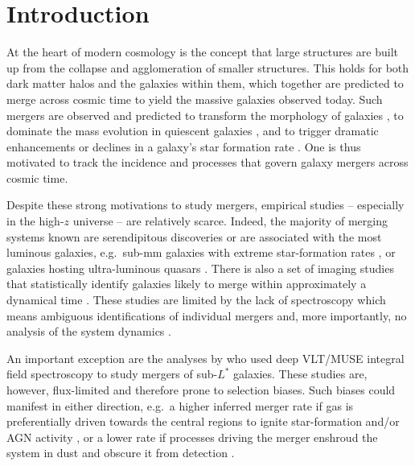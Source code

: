 \documentclass[twocolumn]{aastex62}
\newcommand{\lya}{Ly$\alpha$}
\begin{document}
\section{Introduction}

At the heart of modern cosmology is the concept that large structures are built up 
from the collapse and agglomeration of smaller structures. This holds for both dark 
matter halos and the galaxies within them, which together are predicted to merge 
across cosmic time to yield the massive galaxies observed today. Such 
mergers are observed and predicted to transform the morphology of galaxies 
\citep[e.g.][]{mh96,naab2003,lotz+08b}, to dominate the mass evolution in quiescent 
galaxies \citep[e.g.][]{bell+06}, and to trigger dramatic enhancements or declines
in a galaxy's star formation rate \citep[e.g.][]{spf01,jogee+2009,patton+2011}.
One is thus motivated to track the incidence and processes that govern galaxy mergers 
across cosmic time.

Despite these strong motivations to study mergers, empirical studies -- especially in the high-$z$ 
universe -- are relatively scarce. Indeed, the majority of merging systems known
are serendipitous discoveries \citep[e.g.][]{cooke+2010} or are associated with 
the most luminous galaxies, e.g.\ sub-mm galaxies with 
extreme star-formation rates \citep[SFRs;][]{olivares+16}, or galaxies hosting 
ultra-luminous quasars \citep{neeleman+19b}.
There is also a set of imaging studies that statistically identify galaxies likely to
merge within approximately a dynamical time \citep[e.g.][]{patton+1997,bundy+2009,mantha+2018}.
These studies are limited by the lack of spectroscopy which means ambiguous identifications
of individual mergers and, more importantly, no analysis of the system dynamics
\citep[e.g.][]{ellison+10}.

An important exception are the analyses by \citet{ventou+2017,ventou+2019}
who used deep VLT/MUSE integral field spectroscopy to study mergers of sub-$L^*$ galaxies. 
These studies are, however, flux-limited and therefore prone to selection biases.
Such biases could manifest in either direction, e.g.\ a higher inferred merger rate if 
gas is preferentially driven towards the central regions to ignite star-formation 
and/or AGN activity \citep[e.g.][]{mh96}, or a lower rate if processes driving the 
merger enshroud the system in dust and obscure it from detection \citep[e.g.][]{treister+10}.
\end{document}
